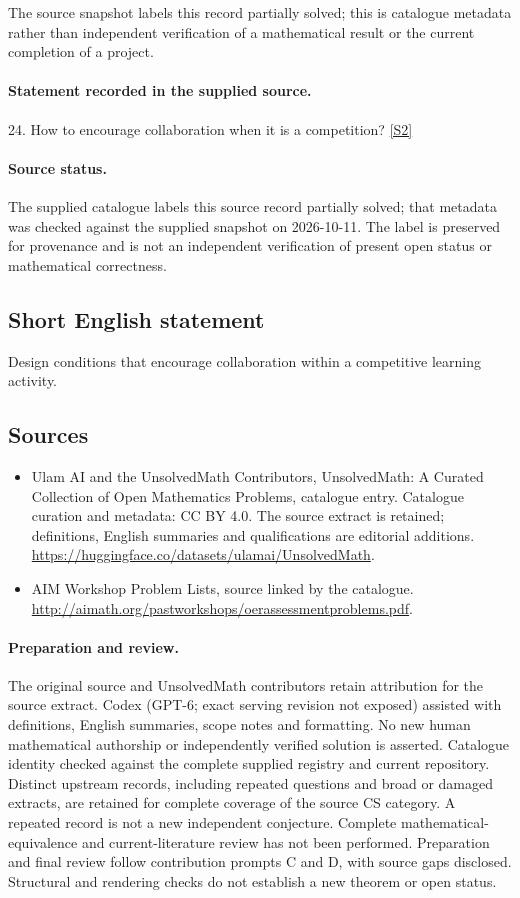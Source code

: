 \documentclass[11pt]{article}
\begin{document}
The source snapshot labels this record partially solved; this is catalogue metadata rather than independent verification of a mathematical result or the current completion of a project.
\paragraph{Statement recorded in the supplied source.}
24. How to encourage collaboration when it is a competition? \href{http://aimath.org/pastworkshops/oerassessmentproblems.pdf}{[S2]}
\paragraph{Source status.}
The supplied catalogue labels this source record partially solved; that metadata was checked against the supplied snapshot on 2026-10-11. The label is preserved for provenance and is not an independent verification of present open status or mathematical correctness.
\subsection{Short English statement}
Design conditions that encourage collaboration within a competitive learning activity.
\subsection{Sources}
\begin{itemize}
\item[S1] Ulam AI and the UnsolvedMath Contributors, UnsolvedMath: A Curated Collection of Open Mathematics Problems, catalogue entry. Catalogue curation and metadata: CC BY 4.0. The source extract is retained; definitions, English summaries and qualifications are editorial additions.
\url{https://huggingface.co/datasets/ulamai/UnsolvedMath}.
\item[S2] AIM Workshop Problem Lists, source linked by the catalogue.
\url{http://aimath.org/pastworkshops/oerassessmentproblems.pdf}.
\end{itemize}
\paragraph{Preparation and review.}
The original source and UnsolvedMath contributors retain attribution for the source extract. Codex (GPT-6; exact serving revision not exposed) assisted with definitions, English summaries, scope notes and formatting. No new human mathematical authorship or independently verified solution is asserted. Catalogue identity checked against the complete supplied registry and current repository. Distinct upstream records, including repeated questions and broad or damaged extracts, are retained for complete coverage of the source CS category. A repeated record is not a new independent conjecture. Complete mathematical-equivalence and current-literature review has not been performed. Preparation and final review follow contribution prompts C and D, with source gaps disclosed. Structural and rendering checks do not establish a new theorem or open status.
\label{end:statement}
\end{document}
